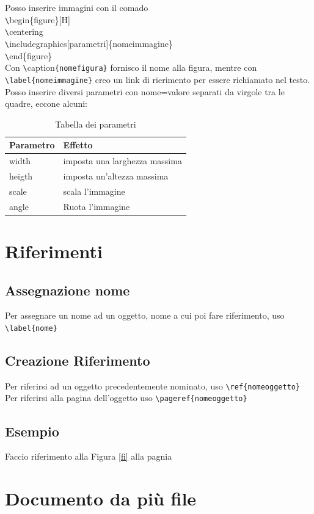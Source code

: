Posso inserire immagini con il comado\\
\verb|\|begin\{figure\}[H]\\
\verb|\|centering\\
\verb|\|includegraphics[parametri]\{nomeimmagine\}\\
\verb|\|end\{figure\}\\

Con \verb|\|caption\verb|{nomefigura}| fornisco il nome alla figura, mentre con \verb|\label{nomeimmagine}| creo un link di rierimento per essere richiamato nel testo.\\
Posso inserire diversi parametri con nome=valore separati da virgole tra le quadre, eccone alcuni:

\begin{table}
\centering
\begin{tabular}{ll}
\toprule
Parametro & Effetto \\
\midrule
width & imposta una larghezza massima \\
heigth & imposta un'altezza massima \\
scale & scala l'immagine \\
angle & Ruota l'immagine \\
\bottomrule
\end{tabular}
\caption{Tabella dei parametri}
\end{table}

\chapter{Riferimenti}
\section{Assegnazione nome}
Per assegnare un nome ad un oggetto, nome a cui poi fare riferimento, uso \verb|\label{nome}|
\section{Creazione Riferimento}
Per riferirsi ad un oggetto precedentemente nominato, uso \verb|\ref{nomeoggetto}|\\
Per riferirsi alla pagina dell'oggetto uso \verb|\pageref{nomeoggetto}|
\section{Esempio}
Faccio riferimento alla Figura \ref{fi} alla pagnia \pageref{fi}

\chapter{Documento da più file}
